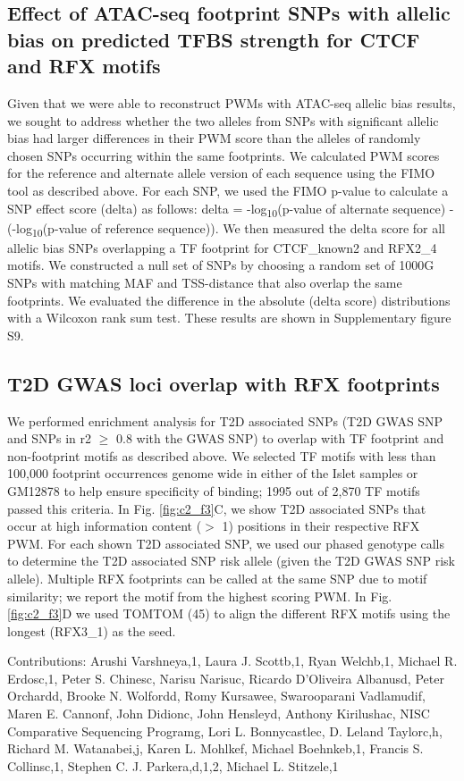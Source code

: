 \subsection{Effect of ATAC-seq footprint SNPs with allelic bias on predicted TFBS strength for CTCF and RFX motifs}
Given that we were able to reconstruct PWMs with ATAC-seq allelic bias results, we sought to address whether the two alleles from SNPs with significant allelic bias had larger differences in their PWM score than the alleles of randomly chosen SNPs occurring within the same footprints. We calculated PWM scores for the reference and alternate allele version of each sequence using the FIMO tool as described above. For each SNP, we used the FIMO p-value to calculate a SNP effect score (delta) as follows:  delta = -log\textsubscript{10}(p-value of alternate sequence) - (-log\textsubscript{10}(p-value of reference sequence)). We then measured the delta score for all allelic bias SNPs overlapping a TF footprint for CTCF_known2 and RFX2_4 motifs. We constructed a null set of SNPs by choosing a random set of 1000G SNPs with matching MAF and TSS-distance that also overlap the same footprints. We evaluated the difference in the absolute (delta score) distributions with a Wilcoxon rank sum test. These results are shown in Supplementary figure S9.

\subsection{T2D GWAS loci overlap with RFX footprints}
We performed enrichment analysis for T2D associated SNPs (T2D GWAS SNP and SNPs in r2 $\geq$ 0.8 with the GWAS SNP) to overlap with TF footprint and non-footprint motifs as described above. We selected TF motifs with less than 100,000 footprint occurrences genome wide in either of the Islet samples or GM12878 to help ensure specificity of binding; 1995 out of 2,870 TF motifs passed this criteria.  In Fig. \ref{fig:c2_f3}C, we show T2D associated SNPs that occur at high information content ($>$ 1) positions in their respective RFX PWM. For each shown T2D associated SNP, we used our phased genotype calls to determine the T2D associated SNP risk allele (given the T2D GWAS SNP risk allele). Multiple RFX footprints can be called at the same SNP due to motif similarity; we report the motif from the highest scoring PWM. In Fig. \ref{fig:c2_f3}D we used TOMTOM (45) to align the different RFX motifs using the longest (RFX3_1) as the seed.


Contributions:
Arushi Varshneya,1, Laura J. Scottb,1, Ryan Welchb,1, Michael R. Erdosc,1, Peter S. Chinesc, Narisu Narisuc, Ricardo D’Oliveira Albanusd, Peter Orchardd, Brooke N. Wolfordd, Romy Kursawee, Swarooparani Vadlamudif, Maren E. Cannonf, John Didionc, John Hensleyd, Anthony Kirilushac, NISC Comparative Sequencing Programg, Lori L. Bonnycastlec, D. Leland Taylorc,h, Richard M. Watanabei,j, Karen L. Mohlkef, Michael Boehnkeb,1, Francis S. Collinsc,1, Stephen C. J. Parkera,d,1,2, Michael L. Stitzele,1

